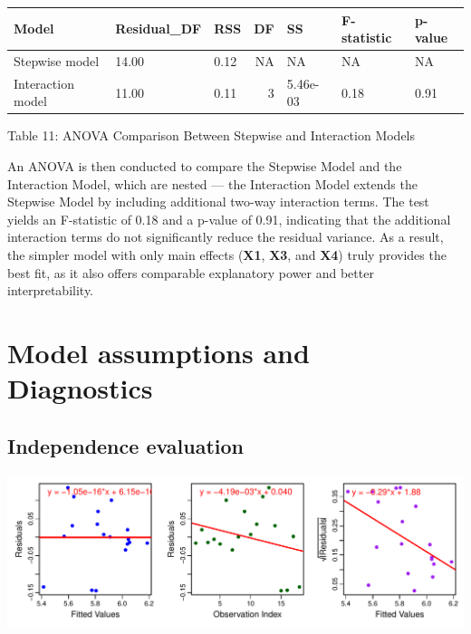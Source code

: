 \documentclass[
  12pt,
]{article}
\begin{document}
\begin{table}[!h]
\centering\begingroup\fontsize{8}{10}\selectfont

\begin{tabular}{lllrlll}
\toprule
Model & Residual\_DF & RSS & DF & SS & F-statistic & p-value\\
\midrule
Stepwise model & 14.00 & 0.12 & NA & NA & NA & NA\\
Interaction model & 11.00 & 0.11 & 3 & 5.46e-03 & 0.18 & 0.91\\
\bottomrule
\end{tabular}
\endgroup{}
\end{table}
\begin{center}
\vspace{-1.6em}
{\fontsize{12}{14}\selectfont Table 11: ANOVA Comparison Between Stepwise and Interaction Models\par}
\end{center}

An ANOVA is then conducted to compare the Stepwise Model and the
Interaction Model, which are nested --- the Interaction Model extends
the Stepwise Model by including additional two-way interaction terms.
The test yields an F-statistic of 0.18 and a p-value of 0.91, indicating
that the additional interaction terms do not significantly reduce the
residual variance. As a result, the simpler model with only main effects
(\textbf{X1}, \textbf{X3}, and \textbf{X4}) truly provides the best fit,
as it also offers comparable explanatory power and better
interpretability.

\section{Model assumptions and
Diagnostics}\label{model-assumptions-and-diagnostics}

\subsection{Independence evaluation}\label{independence-evaluation}

\includegraphics{report1_r1_files/figure-latex/unnamed-chunk-11-1.pdf}
\end{document}
